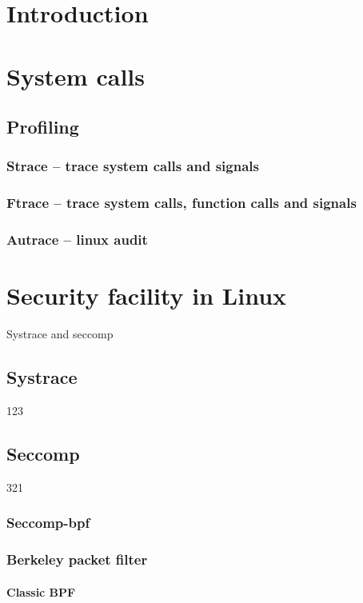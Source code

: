 
\chapter{Introduction}

\chapter{System calls}
\section{Profiling}
\subsection{Strace -- trace system calls and signals}
\subsection{Ftrace -- trace system calls, function calls and signals}
\subsection{Autrace -- linux audit}

\chapter{Security facility in Linux}
Systrace and seccomp\cite{Pravidla}
\section{Systrace}
123

\section{Seccomp}
321
\subsection{Seccomp-bpf}

\subsection{Berkeley packet filter}
\subsubsection{Classic BPF}
